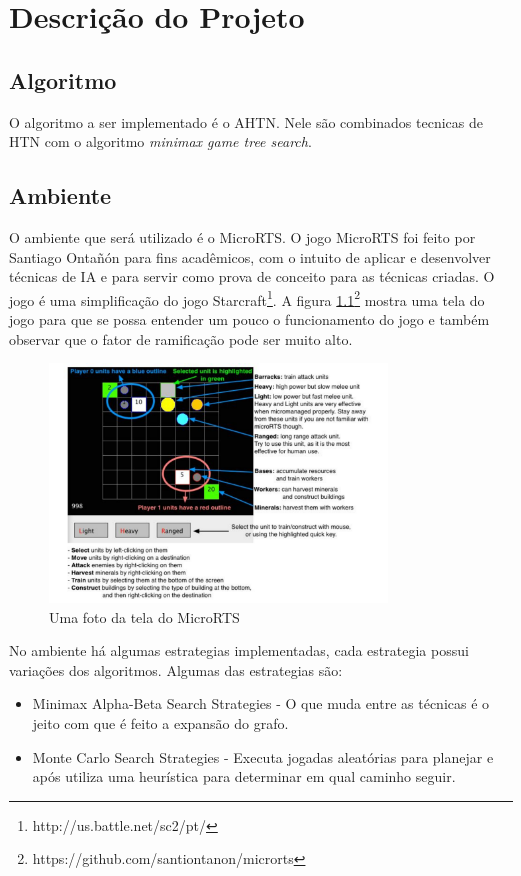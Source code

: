\chapter{\label{chap:descr}Descrição do Projeto}

\section{Algoritmo}
O algoritmo a ser implementado é o AHTN. Nele são combinados tecnicas de HTN com o algoritmo \textit{minimax game tree search}. 

\section{Ambiente}

O ambiente que será utilizado é o MicroRTS.  O jogo MicroRTS foi feito por Santiago Ontañón \cite{ontanon2013combinatorial} para fins acadêmicos, com o intuito de aplicar e desenvolver técnicas de IA e para servir como prova de conceito para as técnicas criadas.  O jogo é uma simplificação do jogo Starcraft\footnote{http://us.battle.net/sc2/pt/}.
A figura \ref{fig:microrts}\footnote{https://github.com/santiontanon/microrts} mostra uma tela do jogo para que se possa entender um pouco o funcionamento do jogo e também observar que o fator de ramificação pode ser muito alto.

\begin{figure}[ht]
	\centering
	\includegraphics[width=0.8\textwidth]{fig/microrts.pdf}
	\caption{Uma foto da tela do MicroRTS}
	\label{fig:microrts}
\end{figure} 

No ambiente há algumas estrategias implementadas, cada estrategia possui variações dos algoritmos. Algumas das estrategias são:
\begin{itemize}
	\item Minimax Alpha-Beta Search Strategies - O que muda entre as técnicas é o jeito com que é feito a expansão do grafo.
	\item Monte Carlo Search Strategies - Executa jogadas aleatórias para planejar e após utiliza uma heurística para determinar em qual caminho seguir.
\end{itemize}
